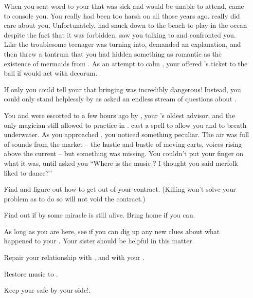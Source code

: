 \documentclass[char]{NeptuneBall}
\begin{document}
When you sent word to your \cKing{\parent} that \cEric{} was sick and would be unable to attend, \cKing{} came to console you. You really had been too harsh on \cKing{\them} all those years ago. \cKing{} really did care about you. Unfortunately, \cWillow{} had snuck down to the beach to play in the ocean despite the fact that it was forbidden. \cWillow{\They} saw you talking to \cKing{} and confronted you. Like the troublesome teenager \cWillow{\they} was turning into, \cWillow{} demanded an explanation, and then threw a tantrum that you had hidden something as romantic as the existence of mermaids from \cWillow{\them}. As an attempt to calm \cWillow{}, your \cKing{\parent} offered \cWillow{\them} \cEric{}'s ticket to the ball if \cWillow{\they} would act with decorum.

If only you could tell your \cKing{\parent} that bringing \cWillow{} was incredibly dangerous! Instead, you could only stand helplessly by as \cWillow{} asked an endless stream of questions about \pAtlantis{}.

You and \cWillow{} were escorted to \pAtlantis{} a few hours ago by \cManta{}, your \cKing{\parent}'s oldest advisor, and the only magician still allowed to practice in \pAtlantis{}. \cManta{} cast a spell to allow you and \cWillow{} to breath underwater. As you approached \pAtlantis{}, you noticed something peculiar. The air was full of sounds from the market -- the hustle and bustle of moving carts, voices rising above the current -- but something was missing. You couldn't put your finger on what it was, until \cWillow{} asked you ``Where is the music \cAriel{\parent}? I thought you said merfolk liked to dance?''

\begin{itemz}[Goals]
  \item Find \cWitch{} and figure out how to get out of your contract. (Killing \cWitch{} won't solve your problem as to do so will not void the contract.)
  \item Find out if by some miracle \cSlave{} is still alive. Bring \cSlave{\them} home if you can.
  \item As long as you are here, see if you can dig up any new  clues about what happened to your \cAthena{\parent}. Your sister should be helpful in this matter.
  \item Repair your relationship with \cKing{\King} \cKing{}, and with your \cPrincess{\sibling} \cPrincess{}.
  \item Restore music to \pAtlantis{}.
  \item Keep your \cWillow{\offspring} safe by your side!.
\end{itemz}
\end{document}
